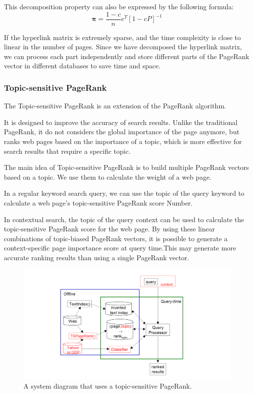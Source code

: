\documentclass[lettersize,journal,12pt,conference]{IEEEtran}
\begin{document}
This decomposition property can also be expressed by the following formula:
\begin{equation}
	\boldsymbol{\pi}=
	\frac{1-c}{n}e^T[1-cP]^{-1}
\end{equation}

If the hyperlink matrix is extremely sparse, and the time complexity is close to linear in the number of pages. Since we have decomposed the hyperlink matrix, we can process each part independently and store different parts of the PageRank vector in different databases to save time and space.

\subsubsection{Topic-sensitive PageRank}

The Topic-sensitive PageRank is an extension of the PageRank algorithm.

It is designed to improve the accuracy of search results. Unlike the traditional PageRank, it do not considers the global importance of the page anymore, but ranks web pages based on the importance of a topic, which is more effective for search results that require a specific topic.

The main idea of Topic-sensitive PageRank is to build multiple PageRank vectors based on a topic. We use them to calculate the weight of a web page.

In a regular keyword search query, we can use the topic of the query keyword to calculate a web page's topic-sensitive PageRank score Number.

In contextual search, the topic of the query context can be used to calculate the topic-sensitive PageRank score for the web page. By using these linear combinations of topic-biased PageRank vectors, it is possible to generate a context-specific page importance score at query time.This may generate more accurate ranking results than using a single PageRank vector.

\begin{figure}[!t]
	\centering
	\includegraphics[width=\textwidth]{images/fig4.png}
	\caption{A system diagram that uses a topic-sensitive PageRank.}
	\label{fig5}
\end{figure}
\end{document}
